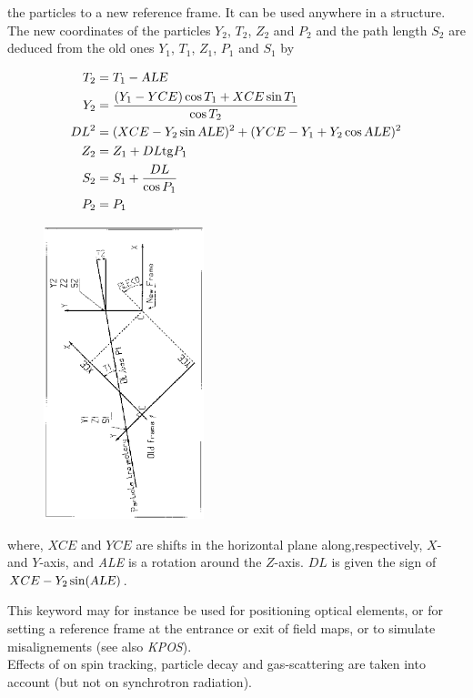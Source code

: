  the particles to a new reference frame.  It can be used anywhere 
in a structure.  The new coordinates of the particles  $ Y_2$,  $ T_2$,  $ Z_2$ and 
$ P_2 $ and the path length $ S_2 $ are deduced from the old ones  $ Y_1$,   
$ T_1$,  $ Z_1$,  $ P_1 $ and $ S_1 $ by
%
\begin{figure}[h]
\begin{minipage}{.4\linewidth}
\begin{align*}
	T_2 &=  T_1- \text{\textsl{ALE}} \\
	Y_2 & = \dfrac{ (Y_1-YCE) \cos T_1+XCE \sin T_1}{\cos  T_2} \\
	DL^2 & =(XCE-Y_2 \sin \text{\textsl{ALE}})^2 
	         +(YCE-Y_1+Y_2 \cos \text{\textsl{ALE}})^2 \\
	Z_2  & = Z_1+DL\mathrm{tg} P_1 \\ 
	S_2 & = S_1+ \dfrac{DL }{ \cos P_1} \\
	P_2 & = P_1  
\end{align*}
\end{minipage}
\begin{minipage}{.5\linewidth}
\centerline{\includegraphics[height=8.5cm,angle=-90]{FigCHAREFa.eps}}
\end{minipage}
\end{figure}
%
\noindent where, $ XCE $ and $ YCE $ are shifts in the horizontal plane along,respectively, 
$ X$- and $ Y$-axis, and \textsl{ALE}  is a rotation around the $ Z$-axis. $ DL $
is given the sign of $ XCE-Y_2 \sin(\text{\textsl{ALE}})$.  

\noindent This keyword may for instance be used
for positioning optical elements, or for setting a reference frame at the entrance
or exit of field maps, or to simulate misalignements (see also  \textsl{KPOS}).  \\
Effects of \CHANGREF on spin tracking, 
particle decay and gas-scattering are taken into account (but not on synchrotron radiation).
\vfill

